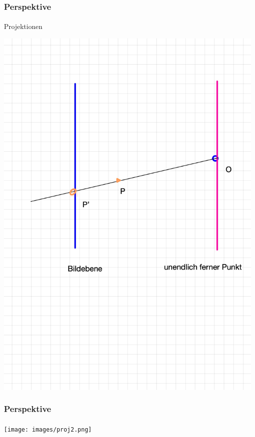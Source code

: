 \documentclass{beamer}
\begin{document}
\begin{frame}
    \frametitle{Perspektive}
\framesubtitle{}
    \begin{block}{Projektionen}
\begin{center}
\includegraphics[scale=0.15]{images/proj1}
\end{center}
\end{block}

\end{frame}




\begin{frame}
    \frametitle{Perspektive}
\framesubtitle{}

\begin{center}
\texttt{[image: images/proj2.png]}
\end{center}
\end{frame}
\end{document}
